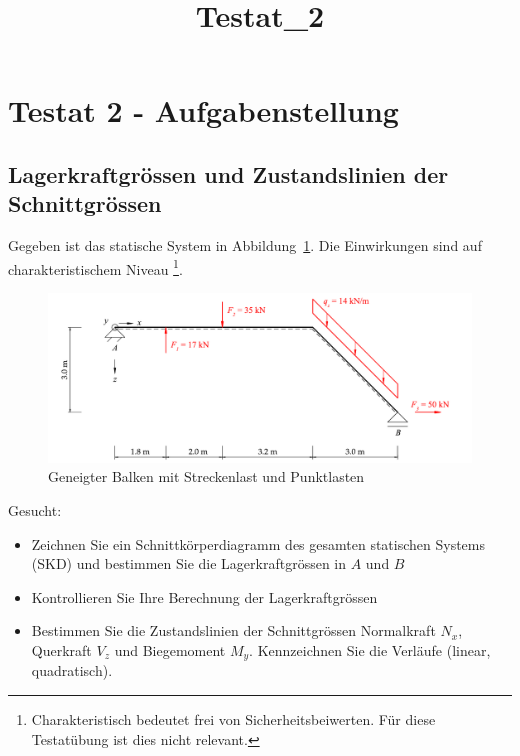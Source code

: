 \documentclass[
  12pt,
  letterpaper,
  DIV=11,
  egregdoesnotlikesansseriftitles]{scrartcl}
\title{Testat\_2}
\author{}
\date{}
\providecommand{\tightlist}{%
  \setlength{\itemsep}{0pt}\setlength{\parskip}{0pt}}\usepackage{longtable,booktabs,array}
\renewcommand{\maketitle}{}
\begin{document}
\maketitle
\ifdefined\Shaded\renewenvironment{Shaded}{\begin{tcolorbox}[sharp corners, boxrule=0pt, breakable, borderline west={3pt}{0pt}{shadecolor}, interior hidden, enhanced, frame hidden]}{\end{tcolorbox}}\fi

\hypertarget{testat-2---aufgabenstellung}{%
\section{Testat 2 -
Aufgabenstellung}\label{testat-2---aufgabenstellung}}

\hypertarget{lagerkraftgruxf6ssen-und-zustandslinien-der-schnittgruxf6ssen}{%
\subsection{Lagerkraftgrössen und Zustandslinien der
Schnittgrössen}\label{lagerkraftgruxf6ssen-und-zustandslinien-der-schnittgruxf6ssen}}

Gegeben ist das statische System in Abbildung~\ref{fig-system}. Die
Einwirkungen sind auf charakteristischem Niveau \footnote{Charakteristisch
  bedeutet frei von Sicherheitsbeiwerten. Für diese Testatübung ist dies
  nicht relevant.}.

\begin{figure}[H]

{\centering \includegraphics{BSI_HS23_Testat_02_files/mediabag/../images/Testat_02_HS23.pdf}

}

\caption{\label{fig-system}Geneigter Balken mit Streckenlast und
Punktlasten}

\end{figure}

Gesucht:

\begin{itemize}
\tightlist
\item
  Zeichnen Sie ein Schnittkörperdiagramm des gesamten statischen Systems
  (SKD) und bestimmen Sie die Lagerkraftgrössen in \(A\) und \(B\)
\item
  Kontrollieren Sie Ihre Berechnung der Lagerkraftgrössen
\item
  Bestimmen Sie die Zustandslinien der Schnittgrössen Normalkraft
  \(N_x\), Querkraft \(V_z\) und Biegemoment \(M_y\). Kennzeichnen Sie
  die Verläufe (linear, quadratisch).
\end{itemize}
\end{document}
